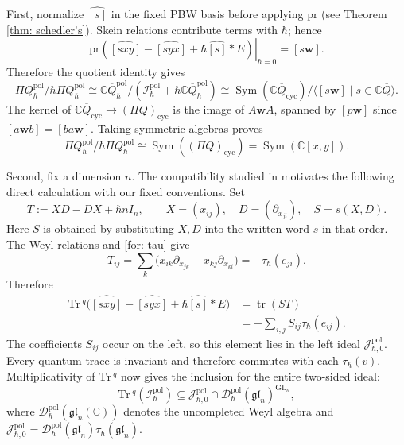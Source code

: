 \documentclass[11pt,reqno]{amsart}
\theoremstyle{definition}
\newcommand{\bbC}{\mathbb{C}}
\newcommand{\gl}{\mathfrak{gl}}
\newcommand{\GL}{\mathrm{GL}}
\newcommand{\Tr}{\mathrm{Tr} \,}
\newcommand{\mD}{\mathcal{D}}
\newcommand{\QQ}{\mathbb{C} \overline{Q}}
\newcommand{\bw}{\mathbf{w}}
\newcommand{\qneck}{{\mathbb{C} \overline{Q}}_{\hbar}}
\newcommand{\cyc}{\mathrm{cyc}}
\newcommand{\Sym}{\operatorname{Sym}}
\newcommand{\pr}{\mathrm{pr}}
\newcommand{\pol}{\mathrm{pol}}
\begin{document}
First,
normalize \(\widehat{[s]}\) in the fixed PBW
basis before applying \(\pr\) (see Theorem \ref{thm: schedler's}).
Skein relations contribute terms with \(\hbar\);
hence
\[
\left.\pr(\widehat{[sxy]}-\widehat{[syx]}+\hbar \widehat{[s]}*E)\right|_{\hbar=0}=[s\bw].
\]
Therefore the quotient identity gives
\[
\Pi Q_\hbar^{\pol} / \hbar \Pi Q_\hbar^{\pol}
\cong\qneck^{\pol}/
 (\mathcal I_\hbar^{\pol}+\hbar \qneck^{\pol})
\cong\Sym(\QQ _\cyc)/\langle[s\bw]\mid s \in \QQ \rangle.
\]
The kernel of \(\QQ_\cyc \to (\Pi Q)_\cyc\) is the image of
\(A\bw A\), spanned by \([p\bw]\)
since
\([a\bw b]=[ba\bw]\).
Taking symmetric algebras proves
\begin{equation}\label{eq: preproj special fibre}
	\Pi Q_\hbar^{\pol} / \hbar \Pi Q_\hbar^{\pol}
\cong\Sym((\Pi Q)_\cyc)=\Sym(\bbC[x,y]).
\end{equation}






Second, fix a dimension \(n\). The compatibility studied in \cite{Zhao2021Com,Zhao2023Non} motivates the following direct calculation with our fixed conventions. Set
\[
T:=XD-DX+\hbar nI_n,
\qquad X=(x_{ij}),\quad D=(\partial_{x_{ji}}),\quad S=s(X,D).
\]
Here \(S\) is obtained by substituting \(X,D\) into the written word \(s\) in that order. The Weyl relations and \eqref{for: tau} give
\[
T_{ij}=\sum_k\bigl(x_{ik}\partial_{x_{jk}}-x_{kj}\partial_{x_{ki}}\bigr)
=-\tau_\hbar(e_{ji}).
\]
Therefore
\begin{align*}
\Tr^q\bigl(\widehat{[sxy]}-\widehat{[syx]}+\hbar\widehat{[s]}*E\bigr)
&=\operatorname{tr}(ST)\\
&=-\sum_{i,j}S_{ij}\tau_\hbar(e_{ij}).
\end{align*}
The coefficients \(S_{ij}\) occur on the left, so this element lies in the left ideal \(\mathcal J_{\hbar,0}^{\pol}\). Every quantum trace is invariant and therefore commutes with each \(\tau_\hbar(v)\). 
Multiplicativity of \(\Tr^q\) now gives the inclusion for the entire two-sided ideal:
\begin{equation}\label{eq: qTr descends}
	\Tr^q(\mathcal I_\hbar^{\pol})
\subseteq
\mathcal J_{\hbar,0}^{\pol}
\cap\mD_\hbar^{\pol}(\gl_n)^{\GL_n},
\end{equation}
where \(\mD_\hbar^{\pol} (\gl_n (\bbC))\) denotes the uncompleted Weyl  algebra
and \(\mathcal J_{\hbar,0}^{\pol}
=\mD_\hbar^{\pol}(\gl_n)\tau_\hbar(\gl_n)\).
\end{document}
